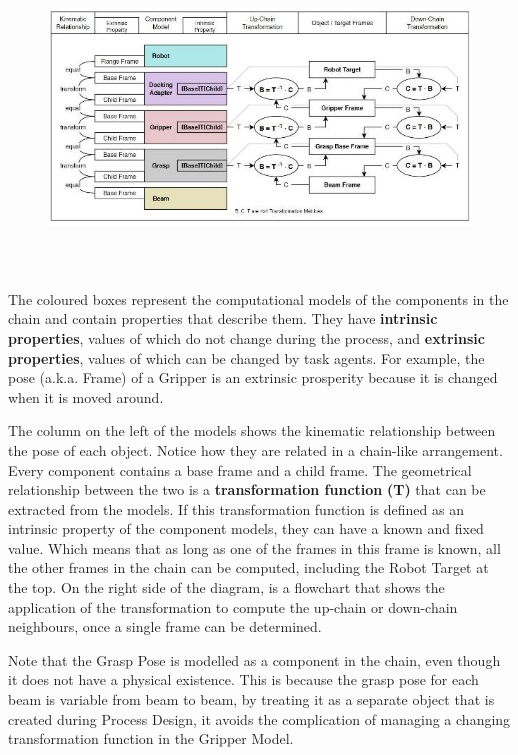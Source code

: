 \documentclass[11pt]{book}
\begin{document}
\begin{figure}[H]
\includegraphics[width=15.92cm,height=8.18cm]{./images/image31.jpeg}
\end{figure}


The coloured boxes represent the computational models of the components in the chain and contain properties that describe them. They have \textbf{intrinsic properties}, values of which do not change during the process, and \textbf{extrinsic properties}, values of which can be changed by task agents. For example, the pose (a.k.a. Frame) of a Gripper is an extrinsic prosperity because it is changed when it is moved around. 

The column on the left of the models shows the kinematic relationship between the pose of each object. Notice how they are related in a chain-like arrangement. Every component contains a base frame and a child frame. The geometrical relationship between the two is a \textbf{transformation function} \textbf{(T) }that can be extracted from the models. If this transformation function is defined as an intrinsic property of the component models, they can have a known and fixed value. Which means that as long as one of the frames in this frame is known, all the other frames in the chain can be computed, including the Robot Target at the top. On the right side of the diagram, is a flowchart that shows the application of the transformation to compute the up-chain or down-chain neighbours, once a single frame can be determined.

Note that the Grasp Pose is modelled as a component in the chain, even though it does not have a physical existence. This is because the grasp pose for each beam is variable from beam to beam, by treating it as a separate object that is created during Process Design, it avoids the complication of managing a changing transformation function in the Gripper Model.
\end{document}
